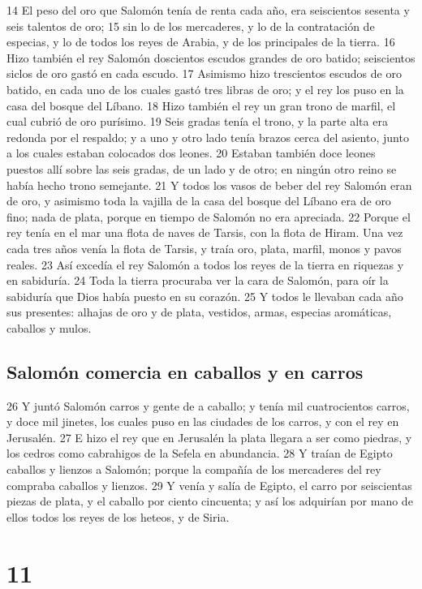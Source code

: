 14 El peso del oro que Salomón tenía de renta cada año, era seiscientos sesenta y seis talentos de oro;
15 sin lo de los mercaderes, y lo de la contratación de especias, y lo de todos los reyes de Arabia, y de los principales de la tierra.
16 Hizo también el rey Salomón doscientos escudos grandes de oro batido; seiscientos siclos de oro   gastó en cada escudo.
17 Asimismo hizo trescientos escudos de oro batido, en cada uno de los cuales gastó tres libras de oro; y el rey los puso en la casa del bosque del Líbano.
18 Hizo también el rey un gran trono de marfil, el cual cubrió de oro purísimo.
19 Seis gradas tenía el trono, y la parte alta era redonda por el respaldo; y a uno y otro lado tenía brazos cerca del asiento, junto a los cuales estaban colocados dos leones.
20 Estaban también doce leones puestos allí sobre las seis gradas, de un lado y de otro; en ningún otro reino se había hecho trono semejante.
21 Y todos los vasos de beber del rey Salomón eran de oro, y asimismo toda la vajilla de la casa del bosque del Líbano era de oro fino; nada de plata, porque en tiempo de Salomón no era apreciada.
22 Porque el rey tenía en el mar una flota de naves de Tarsis, con la flota de Hiram. Una vez cada tres años venía la flota de Tarsis, y traía oro, plata, marfil, monos y pavos reales.
23 Así excedía el rey Salomón a todos los reyes de la tierra en riquezas y en sabiduría.
24 Toda la tierra procuraba ver la cara de Salomón, para oír la sabiduría que Dios había puesto en su corazón.
25 Y todos le llevaban cada año sus presentes: alhajas de oro y de plata, vestidos, armas, especias aromáticas, caballos y mulos.

\section*{Salomón comercia en caballos y en carros}

26 Y juntó Salomón carros y gente de a caballo; y tenía mil cuatrocientos carros, y doce mil jinetes, los cuales puso en las ciudades de los carros, y con el rey en Jerusalén.
27 E hizo el rey que en Jerusalén la plata llegara a ser como piedras, y los cedros como cabrahigos de la Sefela en abundancia.
28 Y traían de Egipto caballos y lienzos a Salomón; porque la compañía de los mercaderes del rey compraba caballos y lienzos.
29 Y venía y salía de Egipto, el carro por seiscientas piezas de plata, y el caballo por ciento cincuenta; y así los adquirían por mano de ellos todos los reyes de los heteos, y de Siria.

\chapter{11}

